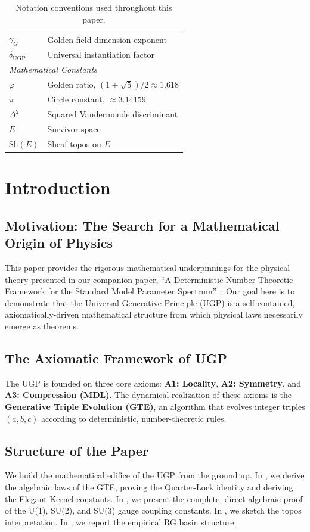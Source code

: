 \documentclass[11pt,twocolumn]{article}
\begin{document}
\begin{table}[h!]
\begin{tabular}{@{}lp{6.5cm}@{}}
        $\gamma_G$ & Golden field dimension exponent \\
        $\delta_{\text{UGP}}$ & Universal instantiation factor \\
        \midrule
        \multicolumn{2}{l}{\textit{Mathematical Constants}} \\
        $\varphi$ & Golden ratio, $(1+\sqrt{5})/2 \approx 1.618$ \\
        $\pi$ & Circle constant, $\approx 3.14159$ \\
        $\Delta^2$ & Squared Vandermonde discriminant \\
        $E$ & Survivor space \\
        $\mathrm{Sh}(E)$ & Sheaf topos on $E$ \\
        \bottomrule
    \end{tabular}
    \caption{Notation conventions used throughout this paper.}
    \label{tab:notation}
\end{table}

\section{Introduction}

\subsection{Motivation: The Search for a Mathematical Origin of Physics}
This paper provides the rigorous mathematical underpinnings for the physical theory presented in our companion paper, ``A Deterministic Number-Theoretic Framework for the Standard Model Parameter Spectrum''~\cite{Spivack2026_SM_UGP}. Our goal here is to demonstrate that the Universal Generative Principle (UGP) is a self-contained, axiomatically-driven mathematical structure from which physical laws necessarily emerge as theorems.

\subsection{The Axiomatic Framework of UGP}
The UGP is founded on three core axioms: \textbf{A1: Locality}, \textbf{A2: Symmetry}, and \textbf{A3: Compression (MDL)}. The dynamical realization of these axioms is the \textbf{Generative Triple Evolution (GTE)}, an algorithm that evolves integer triples $(a,b,c)$ according to deterministic, number-theoretic rules.

\subsection{Structure of the Paper}
We build the mathematical edifice of the UGP from the ground up. In , we derive the algebraic laws of the GTE, proving the Quarter-Lock identity and deriving the Elegant Kernel constants. In , we present the complete, direct algebraic proof of the U(1), SU(2), and SU(3) gauge coupling constants. In , we sketch the topos interpretation. In , we report the empirical RG basin structure.
\end{document}
